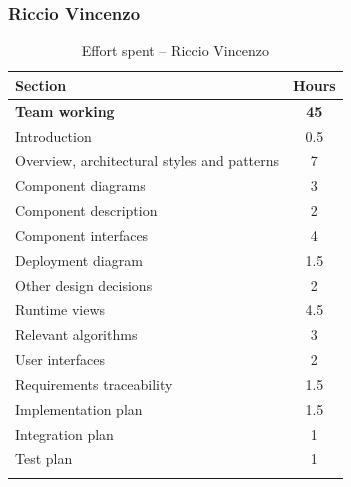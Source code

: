 \documentclass[a4paper,oneside,11pt]{book}
\begin{document}
    \subsubsection{Riccio Vincenzo}
    \begin{longtable}[c]{|H{.55\textwidth}|c|}
        \hline
        \textbf{Section} & {\bfseries{Hours}} \\ \hline
        \textbf{Team working} & \textbf{45} \\ \hline
        Introduction                                  & 0.5 \\ \hline
        Overview, architectural styles and patterns   & 7 \\ \hline
        Component diagrams                            & 3 \\ \hline
        Component description                         & 2 \\ \hline
        Component interfaces                          & 4 \\ \hline
        Deployment diagram                            & 1.5 \\ \hline
        Other design decisions                        & 2 \\ \hline
        Runtime views                                 & 4.5 \\ \hline
        Relevant algorithms                           & 3 \\ \hline
        User interfaces                               & 2 \\ \hline
        Requirements traceability                     & 1.5 \\ \hline
        Implementation plan                           & 1.5 \\ \hline
        Integration plan                              & 1 \\ \hline 
        Test plan                                     & 1 \\ \hline
        \caption{Effort spent -- Riccio Vincenzo}
        \label{table:effort_riccio}
    \end{longtable}
    
\end{document}

